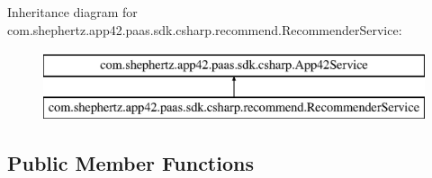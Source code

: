 Inheritance diagram for com.\+shephertz.\+app42.\+paas.\+sdk.\+csharp.\+recommend.\+Recommender\+Service\+:\begin{figure}[H]
\begin{center}
\leavevmode
\includegraphics[height=2.000000cm]{classcom_1_1shephertz_1_1app42_1_1paas_1_1sdk_1_1csharp_1_1recommend_1_1_recommender_service}
\end{center}
\end{figure}
\subsection*{Public Member Functions}
